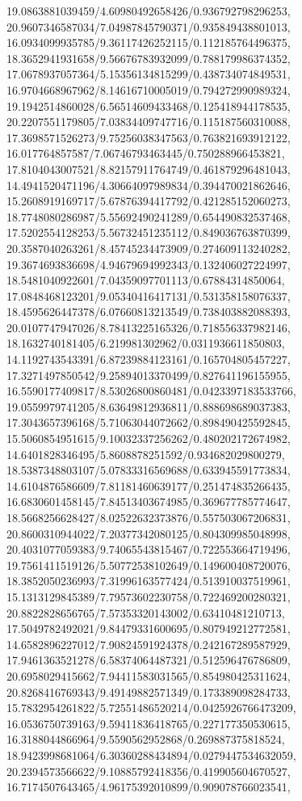 {19.0863881039459/4.60980492658426/0.936792798296253,
20.9607346587034/7.04987845790371/0.935849438801013,
16.0934099935785/9.36117426252115/0.112185764496375,
18.3652941931658/9.56676783932099/0.788179986374352,
17.0678937057364/5.15356134815299/0.438734074849531,
16.9704668967962/8.14616710005019/0.794272990989324,
19.1942514860028/6.56514609433468/0.125418944178535,
20.2207551179805/7.03834409747716/0.115187560310088,
17.3698571526273/9.75256038347563/0.763821693912122,
16.017764857587/7.06746793463445/0.750288966453821,
17.8104043007521/8.82157911764749/0.461879296481043,
14.4941520471196/4.30664097989834/0.394470021862646,
15.2608919169717/5.67876394417792/0.421285152060273,
18.7748080286987/5.55692490241289/0.654490832537468,
17.5202554128253/5.56732451235112/0.849036763870399,
20.3587040263261/8.45745234473909/0.274609113240282,
19.3674693836698/4.94679694992343/0.132406027224997,
18.5481040922601/7.04359097701113/0.67884314850064,
17.0848468123201/9.05340416417131/0.531358158076337,
18.4595626447378/6.07660813213549/0.738403882088393,
20.0107747947026/8.78413225165326/0.718556337982146,
18.1632740181405/6.219981302962/0.0311936611850803,
14.1192743543391/6.87239884123161/0.165704805457227,
17.3271497850542/9.25894013370499/0.827641196155955,
16.5590177409817/8.53026800860481/0.0423397183533766,
19.0559979741205/8.63649812936811/0.888698689037383,
17.3043657396168/5.71063044072662/0.898490425592845,
15.5060854951615/9.10032337256262/0.480202172674982,
14.6401828346495/5.8608878251592/0.934682029800279,
18.5387348803107/5.07833316569688/0.633945591773834,
14.6104876586609/7.81181460639177/0.251474835266435,
16.6830601458145/7.84513403674985/0.369677785774647,
18.5668256628427/8.02522632373876/0.557503067206831,
20.8600310944022/7.20377342080125/0.804309985048998,
20.4031077059383/9.74065543815467/0.722553664719496,
19.7561411519126/5.50772538102649/0.149600408720076,
18.3852050236993/7.31996163577424/0.513910037519961,
15.1313129845389/7.79573602230758/0.722469200280321,
20.8822828656765/7.57353320143002/0.63410481210713,
17.5049782492021/9.84479331600695/0.807949212772581,
14.6582896227012/7.90824591924378/0.242167289587929,
17.9461363521278/6.58374064487321/0.512596476786809,
20.6958029415662/7.94411583031565/0.854980425311624,
20.8268416769343/9.49149882571349/0.173389098284733,
15.7832954261822/5.72551486520214/0.0425926766473209,
16.0536750739163/9.59411836418765/0.227177350530615,
16.3188044866964/9.5590562952868/0.269887375818524,
18.9423998681064/6.30360288434894/0.0279447534632059,
20.2394573566622/9.10885792418356/0.419905604670527,
16.7174507643465/4.96175392010899/0.909078766023541,
}
